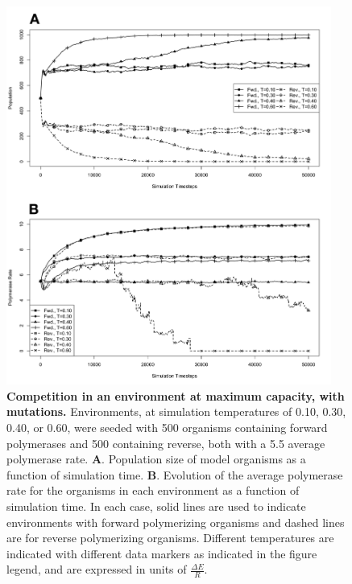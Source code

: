 \begin{figure}[!ht]
	\begin{center}
		\includegraphics[width=0.95\textwidth]{strict_compet_mut}
	\end{center}
	\caption{
		{\bf Competition in an environment at maximum capacity, with mutations.}  Environments, at simulation temperatures of 0.10, 0.30, 0.40, or 0.60, were seeded with 500 organisms containing forward polymerases and 500 containing reverse, both with a 5.5 average polymerase rate. \textbf{A}. Population size of model organisms as a function of simulation time. \textbf{B}. Evolution of the average polymerase rate for the organisms in each environment as a function of simulation time. In each case, solid lines are used to indicate environments with forward polymerizing organisms and dashed lines are for reverse polymerizing organisms. Different temperatures are indicated with different data markers as indicated in the figure legend, and are expressed in units of $\frac{\Delta E}{R}$.
		}
		\label{fig:strict_compet_mut}
\end{figure}


